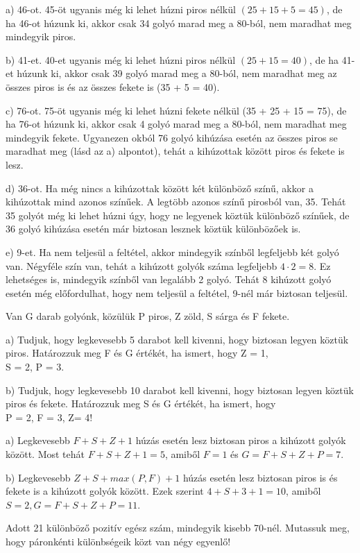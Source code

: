 \begin{solution}
	a) 46-ot. 45-öt ugyanis még ki lehet húzni piros nélkül $(25+15+5=45)$,
	de ha 46-ot húzunk ki, akkor csak 34 golyó marad meg a 80-ból, nem
	maradhat meg mindegyik piros.
	
	b) 41-et. 40-et ugyanis még ki lehet húzni piros nélkül $(25+15=40)$,
	de ha 41-et húzunk ki, akkor csak 39 golyó marad meg a 80-ból, nem
	maradhat meg az összes piros is és az összes fekete is (35 + 5 = 40).
	
	c) 76-ot. 75-öt ugyanis még ki lehet húzni fekete nélkül (35 + 25
	+ 15 = 75), de ha 76-ot húzunk ki, akkor csak 4 golyó marad meg a
	80-ból, nem maradhat meg mindegyik fekete. Ugyanezen okból 76 golyó
	kihúzása esetén az összes piros se maradhat meg (lásd az a) alpontot),
	tehát a kihúzottak között piros és fekete is lesz.
	
	d) 36-ot. Ha még nincs a kihúzottak között két különböző színű, akkor
	a kihúzottak mind azonos színűek. A legtöbb azonos színű pirosból
	van, 35. Tehát 35 golyót még ki lehet húzni úgy, hogy ne legyenek
	köztük különböző színűek, de 36 golyó kihúzása esetén már biztosan
	lesznek köztük különbözőek is.
	
	e) 9-et. Ha nem teljesül a feltétel, akkor mindegyik színből legfeljebb
	két golyó van. Négyféle szín van, tehát a kihúzott golyók száma legfeljebb
	$4\cdot2=8$. Ez lehetséges is, mindegyik színből van legalább 2 golyó.
	Tehát 8 kihúzott golyó esetén még előfordulhat, hogy nem teljesül
	a feltétel, 9-nél már biztosan teljesül. 
\end{solution}
\begin{problem}
	Van G darab golyónk, közülük P piros, Z zöld, S sárga és F fekete. 
	
	\item a) Tudjuk, hogy legkevesebb 5 darabot kell kivenni, hogy biztosan
	legyen köztük piros. Határozzuk meg F és G értékét, ha ismert, hogy
	Z = 1, \\
	S = 2, P = 3. 
	
	\item b) Tudjuk, hogy legkevesebb 10 darabot kell kivenni, hogy biztosan
	legyen köztük piros és fekete. Határozzuk meg S és G értékét, ha ismert,
	hogy \\
	P = 2, F = 3, Z= 4! \\
	
\end{problem}

\begin{solution}
	a) Legkevesebb $F+S+Z+1$ húzás esetén lesz biztosan piros a kihúzott
	golyók között. Most tehát $F+S+Z+1=5$, amiből $F=1$ és $G=F+S+Z+P=7$.
	
	b) Legkevesebb $Z+S+max(P,F)+1$ húzás esetén lesz biztosan piros
	is és fekete is a kihúzott golyók között. Ezek szerint $4+S+3+1=10$,
	amiből $S=2,G=F+S+Z+P=11$. 
\end{solution}
\begin{problem}
	Adott 21 különböző pozitív egész szám, mindegyik kisebb 70-nél. Mutassuk
	meg, hogy páronkénti különbségeik közt van négy egyenlő! \\
	
\end{problem}

